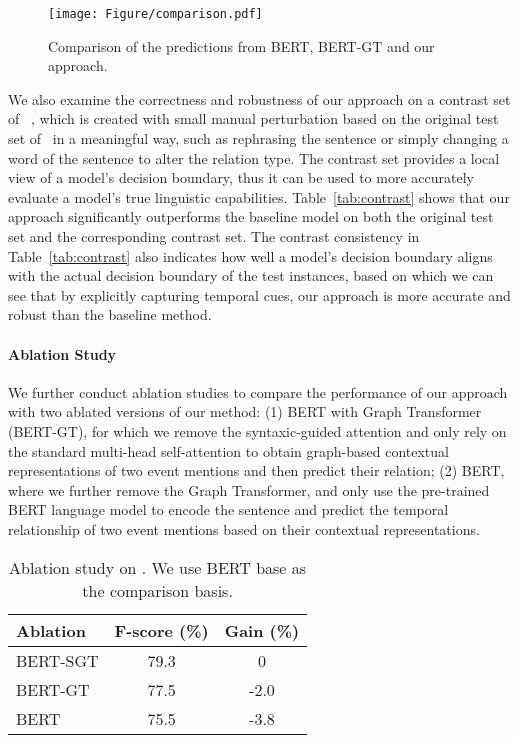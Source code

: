 \begin{figure*}[h]
    \centering
    \texttt{[image: Figure/comparison.pdf]}
    \caption{Comparison of the predictions from BERT, BERT-GT and our approach.}
\label{fig:comparison}
\end{figure*}

We also examine the correctness and robustness of our approach on a contrast set of \matres~\cite{Gardner2020Evaluating}, which is created with small manual perturbation based on the original test set of \matres~in a meaningful way, such as rephrasing the sentence or simply changing a word of the sentence to alter the relation type. The contrast set provides a local view of a model’s decision boundary, thus it can be used to more accurately evaluate a model’s true linguistic capabilities.
Table~\ref{tab:contrast} shows that our approach significantly outperforms the baseline model on both the original test set and the corresponding contrast set. 
The contrast consistency in Table~\ref{tab:contrast} also indicates how well a model's decision boundary aligns with the actual decision boundary of the test instances, based on which we can see that by explicitly capturing temporal cues, our approach is more accurate and robust than the baseline method.






\paragraph{Ablation Study}
We further conduct ablation studies to compare the performance of our approach with two ablated versions of our method: (1) BERT with Graph Transformer (BERT-GT), for which we remove the syntaxic-guided attention and only rely on the standard multi-head self-attention to obtain graph-based contextual representations of two event mentions and then predict their relation; (2) BERT, where we further remove the Graph Transformer, and only use the pre-trained BERT language model to encode the sentence and predict the temporal relationship of two event mentions based on their contextual representations.






\begin{table}[h]
\small
\centering
\begin{tabular}{l|c|c}
\toprule
Ablation & F-score (\%) & Gain (\%) \\ \midrule BERT-SGT & 79.3 & 0 \\ BERT-GT & 77.5 & -2.0 \\ BERT & 75.5 & -3.8\\ \toprule
\end{tabular}
\caption{Ablation study on \matres. We use BERT base as the comparison basis.}
\label{tab:ablation study}
\end{table}


